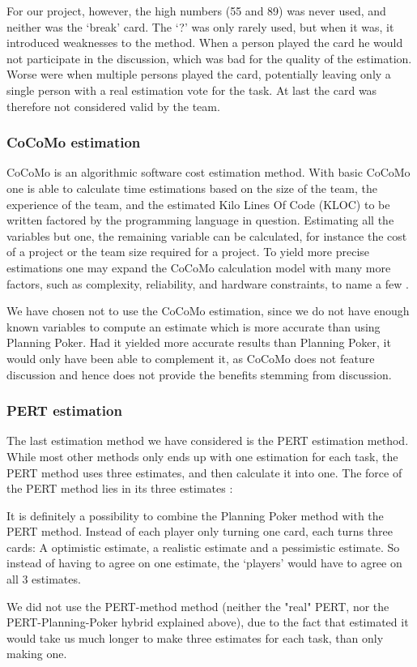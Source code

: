 For our project, however, the high numbers (55 and 89) was never used, and neither was the `break' card. The `?' was only rarely used, but when it was, it introduced weaknesses to the method.
When a person played the card he would not participate in the discussion, which was bad for the quality of the estimation. Worse were when multiple persons played the card, potentially leaving only a single person with a real estimation vote for the task.
At last the card was therefore not considered valid by the team.

\subsubsection{CoCoMo estimation}
CoCoMo is an algorithmic software cost estimation method. With basic CoCoMo one is able to calculate time estimations based on the size of the team, the experience of the team, and the estimated Kilo Lines Of Code (KLOC) to be written factored by the programming language in question.
Estimating all the variables but one, the remaining variable can be calculated, for instance the cost of a project or the team size required for a project. To yield more precise estimations one may expand the CoCoMo calculation model with many more factors, such as complexity, reliability, and hardware constraints, to name a few \cite[p. 147]{PM}.

We have chosen not to use the CoCoMo estimation, since we do not have enough known variables to compute an estimate which is more accurate than using Planning Poker. Had it yielded more accurate results than Planning Poker, it would only have been able to complement it, as CoCoMo does not feature discussion and hence does not provide the benefits stemming from discussion.

\subsubsection{PERT estimation}
The last estimation method we have considered is the PERT estimation method. While most other methods only ends up with one estimation for each task, the PERT method uses three estimates, and then calculate it into one. The force of the PERT method lies in its three estimates \cite[p. 152]{PM}:

It is definitely a possibility to combine the Planning Poker method with the PERT method. Instead of each player only turning one card, each turns three cards: A optimistic estimate, a realistic estimate and a pessimistic estimate. So instead of having to agree on one estimate, the `players' would have to agree on all 3 estimates.

We did not use the PERT-method method (neither the "real" PERT, nor the PERT-Planning-Poker hybrid explained above), due to the fact that estimated it would take us much longer to make three estimates for each task, than only making one.